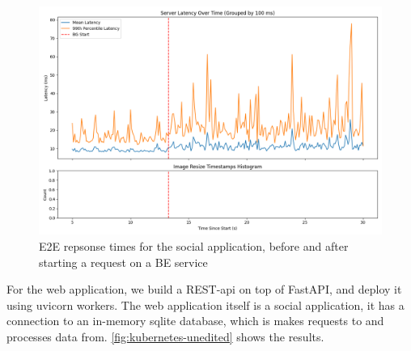 \begin{figure}[t]
    \centering
    \includegraphics[width=\columnwidth]{graphs/kubernetes-unedited.png}
    \caption{E2E repsonse times for the social application, before and after
    starting a request on a BE service}\label{fig:kubernetes-unedited}
\end{figure}



For the web application, we build a REST-api on top of FastAPI, and deploy it
using uvicorn workers. The web application itself is a social application, it
has a connection to an in-memory sqlite database, which is makes requests to and
processes data from. \autoref{fig:kubernetes-unedited} shows the results.





